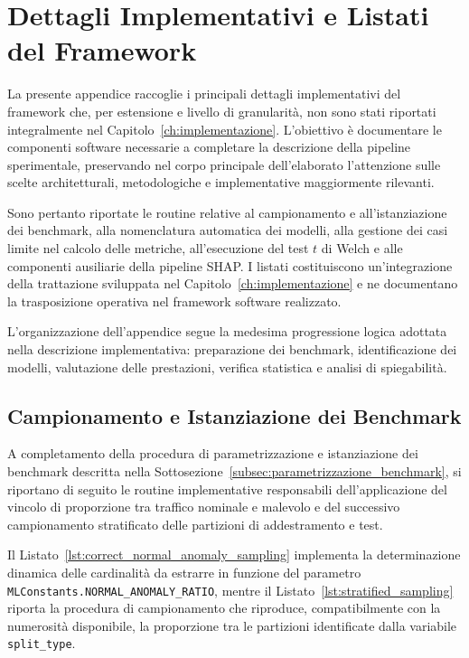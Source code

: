 \chapter{Dettagli Implementativi e Listati del Framework}
\label{app:implementazione}

La presente appendice raccoglie i principali dettagli implementativi del framework che, per estensione e livello di granularità, non sono stati riportati integralmente nel Capitolo~\ref{ch:implementazione}.
L'obiettivo è documentare le componenti software necessarie a completare la descrizione della pipeline sperimentale, preservando nel corpo principale dell'elaborato l'attenzione sulle scelte architetturali, metodologiche e implementative maggiormente rilevanti.

Sono pertanto riportate le routine relative al campionamento e all'istanziazione dei benchmark, alla nomenclatura automatica dei modelli, alla gestione dei casi limite nel calcolo delle metriche, all'esecuzione del test $t$ di Welch e alle componenti ausiliarie della pipeline SHAP.
I listati costituiscono un'integrazione della trattazione sviluppata nel Capitolo~\ref{ch:implementazione} e ne documentano la trasposizione operativa nel framework software realizzato.

L'organizzazione dell'appendice segue la medesima progressione logica adottata nella descrizione implementativa: preparazione dei benchmark, identificazione dei modelli, valutazione delle prestazioni, verifica statistica e analisi di spiegabilità.


\section{Campionamento e Istanziazione dei Benchmark}
\label{app:campionamento_benchmark}

A completamento della procedura di parametrizzazione e istanziazione dei benchmark descritta nella Sottosezione~\ref{subsec:parametrizzazione_benchmark}, si riportano di seguito le routine implementative responsabili dell'applicazione del vincolo di proporzione tra traffico nominale e malevolo e del successivo campionamento stratificato delle partizioni di addestramento e test.

Il Listato~\ref{lst:correct_normal_anomaly_sampling} implementa la determinazione dinamica delle cardinalità da estrarre in funzione del parametro \texttt{MLConstants.NORMAL\_ANOMALY\_RATIO}, mentre il Listato~\ref{lst:stratified_sampling} riporta la procedura di campionamento che riproduce, compatibilmente con la numerosità disponibile, la proporzione tra le partizioni identificate dalla variabile \texttt{split\_type}.

